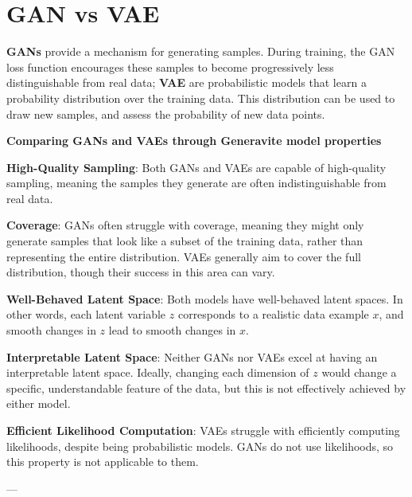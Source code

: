     
    
    
    
    

\section{GAN vs VAE}

\textbf{GANs} provide a mechanism for generating samples. During training, the GAN loss function encourages these samples to become progressively less distinguishable from real data; \textbf{VAE} are probabilistic models that learn a probability distribution over the
training data. This distribution can be used to draw new samples, and assess the probability of new data points.


\textbf{Comparing GANs and VAEs through Generavite model properties}

\textbf{High-Quality Sampling}: Both GANs and VAEs are capable of high-quality sampling, meaning the samples they generate are often indistinguishable from real data.

\textbf{Coverage}: GANs often struggle with coverage, meaning they might only generate samples that look like a subset of the training data, rather than representing the entire distribution. VAEs generally aim to cover the full distribution, though their success in this area can vary.

\textbf{Well-Behaved Latent Space}: Both models have well-behaved latent spaces. In other words, each latent variable $z$ corresponds to a realistic data example $x$, and smooth changes in $z$ lead to smooth changes in $x$.

\textbf{Interpretable Latent Space}: Neither GANs nor VAEs excel at having an interpretable latent space. Ideally, changing each dimension of $z$ would change a specific, understandable feature of the data, but this is not effectively achieved by either model.

\textbf{Efficient Likelihood Computation}: VAEs struggle with efficiently computing likelihoods, despite being probabilistic models. GANs do not use likelihoods, so this property is not applicable to them.

---
